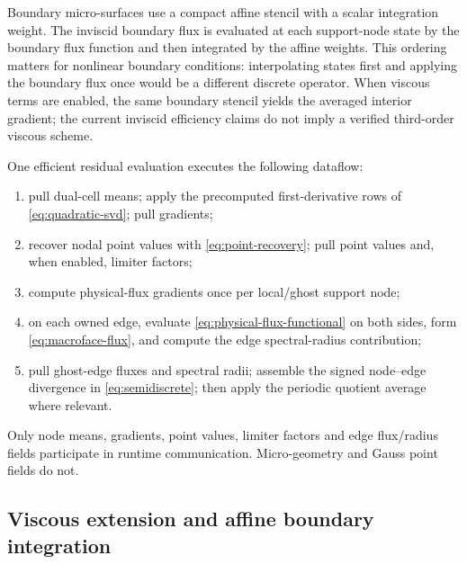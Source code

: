 \documentclass[11pt]{article}
\begin{document}
Boundary micro-surfaces use a compact affine stencil with a scalar integration weight.  The inviscid boundary flux is evaluated at each support-node state by the boundary flux function and then integrated by the affine weights.  This ordering matters for nonlinear boundary conditions: interpolating states first and applying the boundary flux once would be a different discrete operator.  When viscous terms are enabled, the same boundary stencil yields the averaged interior gradient; the current inviscid efficiency claims do not imply a verified third-order viscous scheme.

One efficient residual evaluation executes the following dataflow:
\begin{enumerate}
 \item pull dual-cell means; apply the precomputed first-derivative rows of \eqref{eq:quadratic-svd}; pull gradients;
 \item recover nodal point values with \eqref{eq:point-recovery}; pull point values and, when enabled, limiter factors;
 \item compute physical-flux gradients once per local/ghost support node;
 \item on each owned edge, evaluate \eqref{eq:physical-flux-functional} on both sides, form \eqref{eq:macroface-flux}, and compute the edge spectral-radius contribution;
 \item pull ghost-edge fluxes and spectral radii; assemble the signed node--edge divergence in \eqref{eq:semidiscrete}; then apply the periodic quotient average where relevant.
\end{enumerate}
Only node means, gradients, point values, limiter factors and edge flux/radius fields participate in runtime communication.  Micro-geometry and Gauss point fields do not.

\subsection{Viscous extension and affine boundary integration}\label{sec:viscous-extension}
\end{document}
